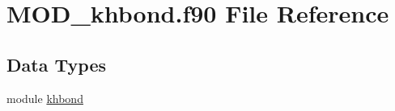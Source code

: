 \hypertarget{MOD__khbond_8f90}{\section{M\-O\-D\-\_\-khbond.\-f90 File Reference}
\label{MOD__khbond_8f90}
}
\subsection*{Data Types}
\begin{DoxyCompactItemize}
\item 
module \hyperlink{classkhbond}{khbond}
\end{DoxyCompactItemize}
